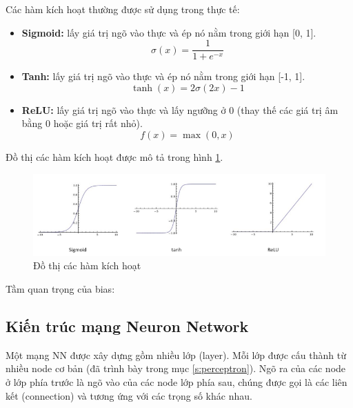 Các hàm kích hoạt thường được sử dụng trong thực tế:
\begin{itemize}
\item \textbf{Sigmoid:} lấy giá trị ngõ vào thực và ép nó nằm trong giới hạn [0, 1].
\begin{equation}
\sigma (x) = \frac{1}{{1 + {e^{ - x}}}}
\end{equation}
\item \textbf{Tanh:} lấy giá trị ngõ vào thực và ép nó nằm trong giới hạn [-1, 1].
\begin{equation}
\tanh (x) = 2\sigma (2x) - 1
\end{equation}
\item \textbf{ReLU:} lấy giá trị ngõ vào thực và lấy ngưỡng ở 0 (thay thế các giá trị âm bằng 0 hoặc giá trị rất nhỏ).
\begin{equation}
f(x) = \max (0,x)
\end{equation}
\end{itemize}

\noindent Đồ thị các hàm kích hoạt được mô tả trong hình \ref{fig:activation_function}.

\FloatBarrier
\begin{figure}[htp]
\begin{center}
\includegraphics[scale=0.8]{chap2/c2_figs/activation_function.PNG}
\end{center}
\caption{Đồ thị các hàm kích hoạt}
\label{fig:activation_function}
\end{figure}
\FloatBarrier

Tầm quan trọng của bias: 

\subsection{Kiến trúc mạng Neuron Network}

Một mạng NN được xây dựng gồm nhiều lớp (layer). Mỗi lớp được cấu thành từ nhiều node cơ bản (đã trình bày trong mục \ref{s:perceptron}). Ngõ ra của các node ở lớp phía trước là ngõ vào của các node lớp phía sau, chúng được gọi là các liên kết (connection) và tương ứng với các trọng số khác nhau.

